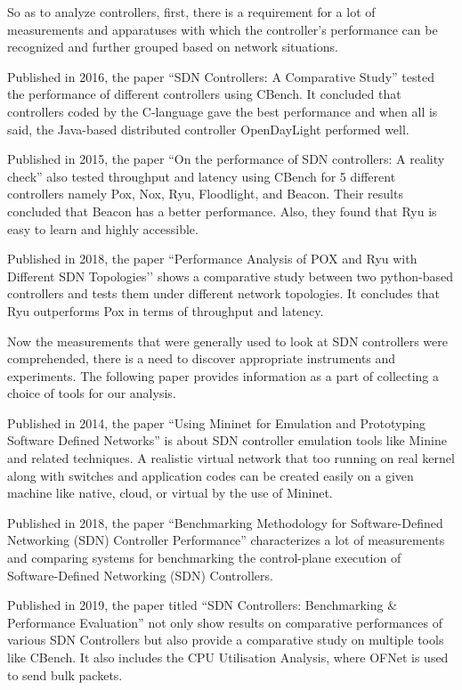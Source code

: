 So as to analyze controllers, first, there is a requirement for a lot of measurements and apparatuses with which the controller's performance can be recognized and further grouped based on network situations.

Published in 2016, the paper ``SDN Controllers: A Comparative Study'' \cite{adaptiveroute2006} tested the performance of different controllers using CBench. It concluded that controllers coded by the C-language gave the best performance and when all is said, the Java-based distributed controller OpenDayLight performed well.

Published in 2015, the paper ``On the performance of SDN controllers: A reality check'' \cite{realitycheck}  also tested throughput and latency using CBench for 5 different controllers namely Pox, Nox, Ryu, Floodlight, and Beacon. Their results concluded that Beacon has a better performance. Also, they found that Ryu is easy to learn and highly accessible.

Published in 2018, the paper ``Performance Analysis of POX and Ryu with Different SDN Topologies’’ shows a comparative study between two python-based controllers and tests them under different network topologies. It concludes that Ryu outperforms Pox in terms of throughput and latency.

Now the measurements that were generally used to look at SDN controllers were comprehended, there is a need to discover appropriate instruments and experiments. The following paper provides information as a part of collecting a choice of tools for our analysis.

Published in 2014, the paper ``Using Mininet for Emulation and Prototyping Software Defined Networks'' \cite{mininet2014} is about SDN controller emulation tools like Minine and related techniques. A realistic virtual network that too running on real kernel along with switches and application codes can be created easily on a given machine like native, cloud, or virtual by the use of Mininet.

Published in 2018, the paper ``Benchmarking Methodology for Software-Defined Networking (SDN) Controller Performance'' \cite{rfc8456} characterizes a lot of measurements and comparing systems for benchmarking the control-plane execution of Software-Defined Networking (SDN) Controllers.

Published in 2019, the paper titled ``SDN Controllers: Benchmarking \& Performance Evaluation'' \cite{zhu2019sdn} not only show results on comparative performances of various SDN Controllers but also provide a comparative study on multiple tools like CBench. It also includes the CPU Utilisation Analysis, where OFNet is used to send bulk packets.

